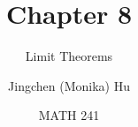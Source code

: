 \documentclass[slidestop,compress,mathserif]{beamer}
\title[Chapter 8]{Chapter 8}
\subtitle{Limit Theorems}
\author[Jingchen (Monika) Hu] %
{Jingchen (Monika) Hu}
\institute[Vassar] %
{Vassar College}
\date[MATH 241] %
{MATH 241}
\begin{document}




\begin{frame}%
\titlepage
\end{frame}


%
%
%
%
%
%
%
%
%
%
%
\end{document}
